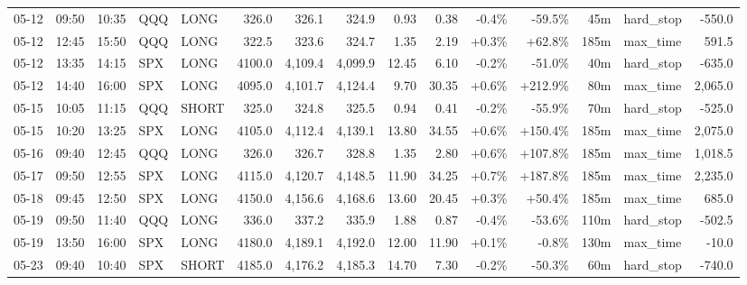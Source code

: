 \documentclass[11pt,a4paper,twoside]{article}
\begin{document}
\begin{landscape}
\begin{center}
\begin{longtable}{>{\color{txtmain}}l l l l l r r r r r r r r >{\color{txtmain}}l r}
05-12 & 09:50 & 10:35 & QQQ & LONG & 326.0 & 326.1 & 324.9 & 0.93 & 0.38 & \textcolor{lossred}{-0.4\%} & \textcolor{lossred}{-59.5\%} & 45m & hard\_stop & \textcolor{lossred}{-550.0} \\
05-12 & 12:45 & 15:50 & QQQ & LONG & 322.5 & 323.6 & 324.7 & 1.35 & 2.19 & \textcolor{wingreen}{+0.3\%} & \textcolor{wingreen}{+62.8\%} & 185m & max\_time & \textcolor{wingreen}{591.5} \\
05-12 & 13:35 & 14:15 & SPX & LONG & 4100.0 & 4,109.4 & 4,099.9 & 12.45 & 6.10 & \textcolor{lossred}{-0.2\%} & \textcolor{lossred}{-51.0\%} & 40m & hard\_stop & \textcolor{lossred}{-635.0} \\
05-12 & 14:40 & 16:00 & SPX & LONG & 4095.0 & 4,101.7 & 4,124.4 & 9.70 & 30.35 & \textcolor{wingreen}{+0.6\%} & \textcolor{wingreen}{+212.9\%} & 80m & max\_time & \textcolor{wingreen}{2,065.0} \\
05-15 & 10:05 & 11:15 & QQQ & SHORT & 325.0 & 324.8 & 325.5 & 0.94 & 0.41 & \textcolor{lossred}{-0.2\%} & \textcolor{lossred}{-55.9\%} & 70m & hard\_stop & \textcolor{lossred}{-525.0} \\
05-15 & 10:20 & 13:25 & SPX & LONG & 4105.0 & 4,112.4 & 4,139.1 & 13.80 & 34.55 & \textcolor{wingreen}{+0.6\%} & \textcolor{wingreen}{+150.4\%} & 185m & max\_time & \textcolor{wingreen}{2,075.0} \\
05-16 & 09:40 & 12:45 & QQQ & LONG & 326.0 & 326.7 & 328.8 & 1.35 & 2.80 & \textcolor{wingreen}{+0.6\%} & \textcolor{wingreen}{+107.8\%} & 185m & max\_time & \textcolor{wingreen}{1,018.5} \\
05-17 & 09:50 & 12:55 & SPX & LONG & 4115.0 & 4,120.7 & 4,148.5 & 11.90 & 34.25 & \textcolor{wingreen}{+0.7\%} & \textcolor{wingreen}{+187.8\%} & 185m & max\_time & \textcolor{wingreen}{2,235.0} \\
05-18 & 09:45 & 12:50 & SPX & LONG & 4150.0 & 4,156.6 & 4,168.6 & 13.60 & 20.45 & \textcolor{wingreen}{+0.3\%} & \textcolor{wingreen}{+50.4\%} & 185m & max\_time & \textcolor{wingreen}{685.0} \\
05-19 & 09:50 & 11:40 & QQQ & LONG & 336.0 & 337.2 & 335.9 & 1.88 & 0.87 & \textcolor{lossred}{-0.4\%} & \textcolor{lossred}{-53.6\%} & 110m & hard\_stop & \textcolor{lossred}{-502.5} \\
05-19 & 13:50 & 16:00 & SPX & LONG & 4180.0 & 4,189.1 & 4,192.0 & 12.00 & 11.90 & \textcolor{wingreen}{+0.1\%} & \textcolor{lossred}{-0.8\%} & 130m & max\_time & \textcolor{lossred}{-10.0} \\
05-23 & 09:40 & 10:40 & SPX & SHORT & 4185.0 & 4,176.2 & 4,185.3 & 14.70 & 7.30 & \textcolor{lossred}{-0.2\%} & \textcolor{lossred}{-50.3\%} & 60m & hard\_stop & \textcolor{lossred}{-740.0} \\

\end{longtable}
\end{center}
\end{landscape}
\end{document}

